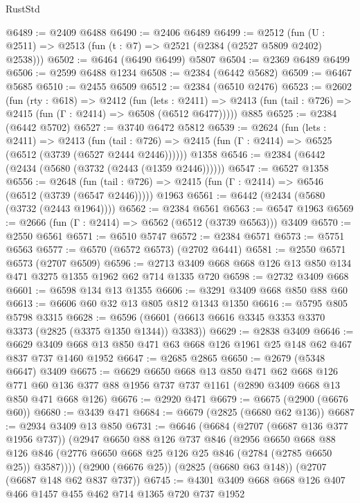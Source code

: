 \begin{lexlean}{RustStd}
\begin{coremodule}
@6489 := @2409 @6488
@6490 := @2406 @6489
@6499 := @2512 (fun (U : @2511) => @2513 (fun (t : @7) => @2521 (@2384 (@2527 @5809 @2402) @2538)))
@6502 := @6464 (@6490 @6499) @5807
@6504 := @2369 @6489 @6499
@6506 := @2599 @6488 @1234
@6508 := @2384 (@6442 @5682)
@6509 := @6467 @5685
@6510 := @2455 @6509
@6512 := @2384 (@6510 @2476)
@6523 := @2602
    (fun (rty : @618) =>
    @2412
      (fun (lets : @2411) =>
      @2413 (fun (tail : @726) => @2415 (fun (Γ : @2414) => @6508 (@6512 @6477)))))
    @885
@6525 := @2384 (@6442 @5702)
@6527 := @3740 @6472 @5812
@6539 := @2624
    (fun (lets : @2411) =>
    @2413
      (fun (tail : @726) => @2415 (fun (Γ : @2414) => @6525 (@6512 (@3739 (@6527 @2444 @2446))))))
    @1358
@6546 := @2384 (@6442 (@2434 (@5680 (@3732 (@2443 (@1359 @2446))))))
@6547 := @6527 @1358
@6556 := @2648
    (fun (tail : @726) => @2415 (fun (Γ : @2414) => @6546 (@6512 (@3739 (@6547 @2446)))))
    @1963
@6561 := @6442 (@2434 (@5680 (@3732 (@2443 @1964))))
@6562 := @2384 @6561
@6563 := @6547 @1963
@6569 := @2666 (fun (Γ : @2414) => @6562 (@6512 (@3739 @6563))) @3409
@6570 := @2550 @6561
@6571 := @6510 @5747
@6572 := @2384 @6571
@6573 := @5751 @6563
@6577 := @6570 (@6572 @6573) (@2702 @6441)
@6581 := @2550 @6571 @6573 (@2707 @6509)
@6596 := @2713 @3409 @668 @668 @126 @13 @850 @134 @471 @3275 @1355 @1962 @62 @714 @1335 @720
@6598 := @2732 @3409 @668
@6601 := @6598 @134 @13 @1355
@6606 := @3291 @3409 @668 @850 @88 @60
@6613 := @6606 @60 @32 @13 @805 @812 @1343 @1350
@6616 := @5795 @805 @5798 @3315
@6628 := @6596 (@6601 (@6613 @6616 @3345 @3353 @3370 @3373 (@2825 (@3375 @1350 @1344)) @3383))
@6629 := @2838 @3409
@6646 := @6629 @3409 @668 @13 @850 @471 @63 @668 @126 @1961 @25 @148 @62 @467 @837 @737 @1460 @1952
@6647 := @2685 @2865
@6650 := @2679 (@5348 @6647) @3409
@6675 := @6629
    @6650
    @668
    @13
    @850
    @471
    @62
    @668
    @126
    @771
    @60
    @136
    @377
    @88
    @1956
    @737
    @737
    @1161
    (@2890 @3409 @668 @13 @850 @471 @668 @126)
@6676 := @2920 @471
@6679 := @6675 (@2900 (@6676 @60))
@6680 := @3439 @471
@6684 := @6679 (@2825 (@6680 @62 @136))
@6687 := @2934 @3409 @13 @850
@6731 := @6646
    (@6684
      (@2707 (@6687 @136 @377 @1956 @737))
      (@2947
        @6650
        @88
        @126
        @737
        @846
        (@2956
          @6650
          @668
          @88
          @126
          @846
          (@2776 @6650 @668 @25 @126 @25 @846 (@2784 (@2785 @6650 @25)) @3587))))
    (@2900 (@6676 @25))
    (@2825 (@6680 @63 @148))
    (@2707 (@6687 @148 @62 @837 @737))
@6745 := @4301 @3409 @668 @668 @126 @407 @466 @1457 @455 @462 @714 @1365 @720 @737 @1952

\end{coremodule}
\end{lexlean}
